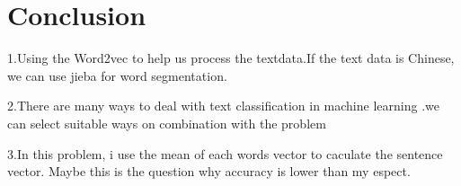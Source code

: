 \section{Conclusion}
 1.Using the Word2vec to help us process the textdata.If the text data is Chinese, we can use jieba for word segmentation.
 \
 
 2.There are many ways to deal with text classification in machine learning .we can select suitable ways on combination with the problem
 \
 
 3.In this problem, i use the mean of each words vector to caculate the sentence vector. Maybe this is the question why accuracy is lower than my espect.  


















